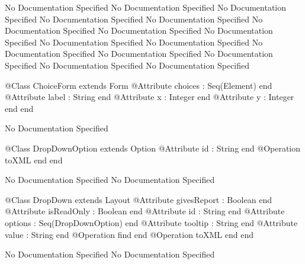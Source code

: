 No Documentation Specified
No Documentation Specified
No Documentation Specified
No Documentation Specified
No Documentation Specified
No Documentation Specified
No Documentation Specified
No Documentation Specified
No Documentation Specified
No Documentation Specified
No Documentation Specified
No Documentation Specified
No Documentation Specified
No Documentation Specified
No Documentation Specified
\begin{Interface}
@Class ChoiceForm extends Form
  @Attribute choices : Seq(Element) end
  @Attribute label : String end
  @Attribute x : Integer end
  @Attribute y : Integer end
end
\end{Interface}
No Documentation Specified
\begin{Interface}
@Class DropDownOption extends Option
  @Attribute id : String end
  @Operation toXML end
end
\end{Interface}
No Documentation Specified
No Documentation Specified
\begin{Interface}
@Class DropDown extends Layout
  @Attribute givesReport : Boolean end
  @Attribute isReadOnly : Boolean end
  @Attribute id : String end
  @Attribute options : Seq(DropDownOption) end
  @Attribute tooltip : String end
  @Attribute value : String end
  @Operation find end
  @Operation toXML end
end
\end{Interface}
No Documentation Specified
No Documentation Specified
